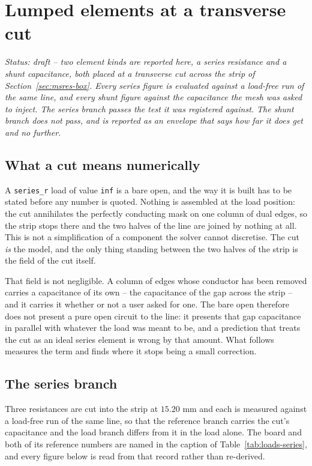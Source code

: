 \section{Lumped elements at a transverse cut}
\label{sec:loads}

\noindent\emph{Status: draft -- two element kinds are reported here, a series resistance and a shunt
capacitance, both placed at a transverse cut across the strip of Section~\ref{sec:msres-box}. Every series
figure is evaluated against a load-free run of the same line, and every shunt figure against the capacitance the
mesh was asked to inject. The series branch passes the test it was registered against. The shunt branch does not
pass, and is reported as an envelope that says how far it does get and no further.}

\subsection{What a cut means numerically}
\label{sec:loads-cut}

A \texttt{series\_r} load of value \texttt{inf} is a bare open, and the way it is built has to be stated before
any number is quoted. Nothing is assembled at the load position: the cut annihilates the perfectly conducting
mask on one column of dual edges, so the strip stops there and the two halves of the line are joined by nothing at
all. This is not a simplification of a component the solver cannot discretise. The cut \emph{is} the model, and
the only thing standing between the two halves of the strip is the field of the cut itself.

That field is not negligible. A column of edges whose conductor has been removed carries a capacitance of its own
-- the capacitance of the gap across the strip -- and it carries it whether or not a user asked for one. The bare
open therefore does not present a pure open circuit to the line: it presents that gap capacitance in parallel
with whatever the load was meant to be, and a prediction that treats the cut as an ideal series element is wrong
by that amount. What follows measures the term and finds where it stops being a small correction.

\subsection{The series branch}
\label{sec:loads-series}

Three resistances are cut into the strip at $15.20$ mm and each is measured against a load-free run of the same
line, so that the reference branch carries the cut's capacitance and the load branch differs from it in the load
alone. The board and both of its reference numbers are named in the caption of
Table~\ref{tab:loads-series}, and every figure below is read from that record rather than re-derived.

